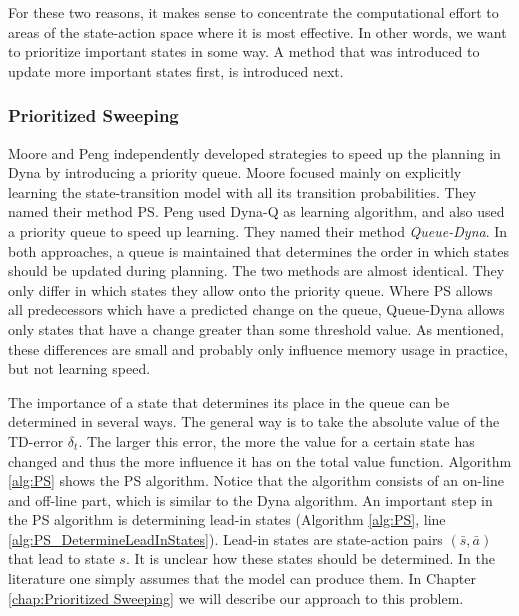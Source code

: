 For these two reasons, it makes sense to concentrate the computational effort to areas of the state-action space where it is most effective. In other words, we want to prioritize important states in some way. A method that was introduced to update more important states first, is introduced next.

\subsubsection{Prioritized Sweeping}\label{sec:RL-Prioritized_sweeping}
	
Moore \cite{MooreAtkeson:93} and Peng \cite{PengWilliams:93} independently developed strategies to speed up the planning in Dyna by introducing a priority queue. Moore focused mainly on explicitly learning the state-transition model with all its transition probabilities. They named their method \ac{PS}. Peng used Dyna-Q as learning algorithm, and also used a priority queue to speed up learning. They named their method \emph{Queue-Dyna}. In both approaches, a queue is maintained that determines the order in which states should be updated during planning. The two methods are almost identical. They only differ in which states they allow onto the priority queue. Where \ac{PS} allows all predecessors which have a predicted change on the queue, Queue-Dyna allows only states that have a change greater than some threshold value. As mentioned, these differences are small and probably only influence memory usage in practice, but not learning speed. 
	
The importance of a state that determines its place in the queue can be determined in several ways. The general way is to take the absolute value of the \acs{TD}-error $\delta_t$. The larger this error, the more the value for a certain state has changed and thus the more influence it has on the total value function. Algorithm \ref{alg:PS} shows the \ac{PS} algorithm. Notice that the algorithm consists of an on-line and off-line part, which is similar to the Dyna algorithm. An important step in the \ac{PS} algorithm is determining lead-in states (Algorithm \ref{alg:PS}, line \ref{alg:PS_DetermineLeadInStates}). Lead-in states are state-action pairs $(\bar{s},\bar{a})$ that lead to state $s$. It is unclear how these states should be determined. In the literature one simply assumes that the model can produce them. In Chapter \ref{chap:Prioritized Sweeping} we will describe our approach to this problem.
	

